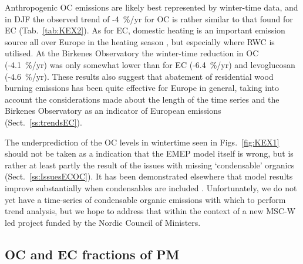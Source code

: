 Anthropogenic OC emissions
are likely best represented by winter-time data, and in DJF the observed trend of -4~\%/yr for OC is rather similar to that found for EC (Tab.~\ref{tab:KEX2}). As
for EC, domestic heating is an important emission source 
all over Europe in the heating season
\citep[e.g.][]{Yttri2019}, but especially where RWC is utilised.
At the Birkenes
Observatory the winter-time reduction in OC (-4.1~\%/yr) was only somewhat
lower than for EC (-6.4~\%/yr) and levoglucosan (-4.6~\%/yr).
These results also suggest
that abatement of residential wood burning emissions has been quite
effective for Europe in general, taking into account the considerations
made about the length of the time series and the Birkenes Observatory as
an indicator of European emissions (Sect.~\ref{ss:trendsEC}).  

The underprediction of the OC levels in wintertime seen in Figs.~\ref{fig:KEX1} should not be taken as a indication that the EMEP model itself is wrong, but is rather at least partly the result of the issues with missing `condensable' organics (Sect.~\ref{ss:IssuesECOC}). It has been demonstrated elsewhere that model results improve substantially when condensables are included \citep{DeniervanderGon2015,R2019:SVOC,R2020:SVOC}. Unfortunately, we do not yet have a time-series of condensable organic emissions with which to perform trend analysis, but we hope to address that within the context of a new MSC-W led project funded by the Nordic Council of Ministers.





\subsection{OC and EC fractions of PM}
\label{ss:OCECfrac}


